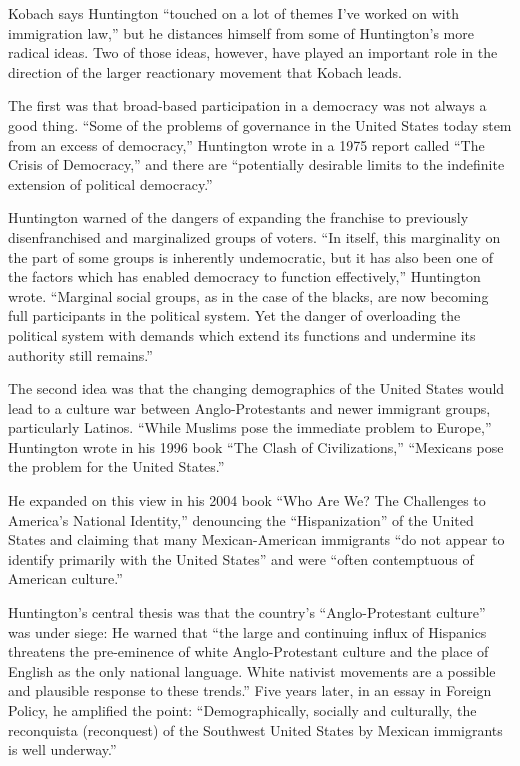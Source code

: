 Kobach says Huntington ``touched on a lot of themes I've worked on with
immigration law,'' but he distances himself from some of Huntington's
more radical ideas. Two of those ideas, however, have played an
important role in the direction of the larger reactionary movement that
Kobach leads.

The first was that broad-based participation in a democracy was not
always a good thing. ``Some of the problems of governance in the United
States today stem from an excess of democracy,'' Huntington wrote in a
1975 report called ``The Crisis of Democracy,'' and there are
``potentially desirable limits to the indefinite extension of political
democracy.''

Huntington warned of the dangers of expanding the franchise to
previously disenfranchised and marginalized groups of voters. ``In
itself, this marginality on the part of some groups is inherently
undemocratic, but it has also been one of the factors which has enabled
democracy to function effectively,'' Huntington wrote. ``Marginal social
groups, as in the case of the blacks, are now becoming full participants
in the political system. Yet the danger of overloading the political
system with demands which extend its functions and undermine its
authority still remains.''

The second idea was that the changing demographics of the United States
would lead to a culture war between Anglo-Protestants and newer
immigrant groups, particularly Latinos. ``While Muslims pose the
immediate problem to Europe,'' Huntington wrote in his 1996 book ``The
Clash of Civilizations,'' ``Mexicans pose the problem for the United
States.''

He expanded on this view in his 2004 book ``Who Are We? The Challenges
to America's National Identity,'' denouncing the ``Hispanization'' of
the United States and claiming that many Mexican-American immigrants
``do not appear to identify primarily with the United States'' and were
``often contemptuous of American culture.''

Huntington's central thesis was that the country's ``Anglo-Protestant
culture'' was under siege: He warned that ``the large and continuing
influx of Hispanics threatens the pre-eminence of white Anglo-Protestant
culture and the place of English as the only national language. White
nativist movements are a possible and plausible response to these
trends.'' Five years later, in an essay in Foreign Policy, he amplified
the point: ``Demographically, socially and culturally, the reconquista
(reconquest) of the Southwest United States by Mexican immigrants is
well underway.''

